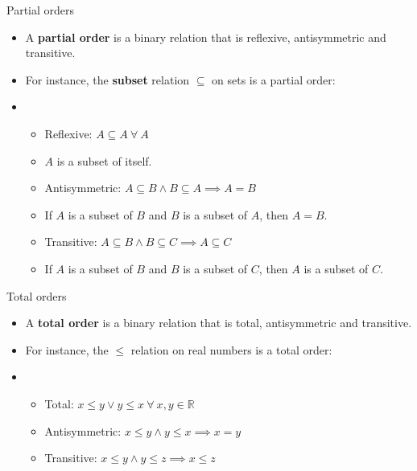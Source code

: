 \documentclass[10pt]{beamer}
\begin{document}
\begin{frame}{Partial orders}
	\begin{itemize}
		\item A \textbf{partial order} is a binary relation that is reflexive, antisymmetric and transitive.
		\item For instance, the \textbf{subset} relation $\subseteq$ on sets is a partial order:
		\item[] \begin{itemize}
			      \item[\checkmark] Reflexive:
			            $A \subseteq A\ \forall\ A$
			      \item[] $A$ is a subset of itself.
			      \item[\checkmark] Antisymmetric:
			            $A \subseteq B \land B \subseteq A \implies A = B$
			      \item[] If $A$ is a subset of $B$ and $B$ is a subset of $A$, then $A = B$.
			      \item[\checkmark] Transitive:
			            $A \subseteq B \land B \subseteq C \implies A \subseteq C$
			      \item[] If $A$ is a subset of $B$ and $B$ is a subset of $C$, then $A$ is a subset of $C$.
		      \end{itemize}
	\end{itemize}
\end{frame}

\begin{frame}{Total orders}
	\begin{itemize}
		\item A \textbf{total order} is a binary relation that is total, antisymmetric and transitive.
		\item For instance, the $\leq$ relation on real numbers is a total order:
		\item[] \begin{itemize}
			      \item[\checkmark]
			            Total:
			            $x \leq y \lor y \leq x\ \forall\ x, y \in \mathbb{R}$
			      \item[\checkmark]
			            Antisymmetric:
			            $x \leq y \land y \leq x \implies x = y$
			      \item[\checkmark]
			            Transitive:
			            $x \leq y \land y \leq z \implies x \leq z$
		      \end{itemize}
	\end{itemize}
\end{frame}
\end{document}
